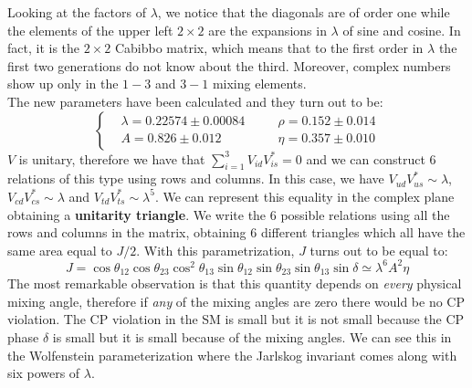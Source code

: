 \documentclass[../main.tex]{subfiles}
\begin{document}
Looking at the factors of $\lambda$, we notice that the diagonals are of order one while the elements of the upper left $2\times2$ are the expansions in $\lambda$ of sine and cosine. In fact, it is the $2\times2$ Cabibbo matrix, which means that to the first order in $\lambda$ the first two generations do not know about the third. Moreover, complex numbers show up only in the $1-3$ and $3-1$ mixing elements.\\
The new parameters have been calculated and they turn out to be:
\[
\left\{
\begin{aligned}
&\lambda=0.22574\pm0.00084 \quad &&\rho=0.152\pm0.014\\
&A=0.826\pm0.012 \quad &&\eta=0.357\pm0.010
\end{aligned}
\right.
\]
$V$ is unitary, therefore we have that $\sum_{i=1}^3V_{id}V_{is}^*=0$ and we can construct 6 relations of this type using rows and columns. In this case, we have $V_{ud}V_{us}^*\sim\lambda$, $V_{cd}V_{cs}^*\sim\lambda$ and $V_{td}V_{ts}^*\sim\lambda^5$. We can represent this equality in the complex plane obtaining a \textbf{unitarity triangle}.
We write the 6 possible relations using all the rows and columns in the matrix, obtaining 6 different triangles which all have the same area equal to $J/2$. With this parametrization, $J$ turns out to be equal to:
\[
J=\cos\theta_{12}\cos\theta_{23}\cos^2\theta_{13}\sin\theta_{12}\sin\theta_{23}\sin\theta_{13}\sin\delta\simeq\lambda^6A^2\eta
\]
The most remarkable observation is that this quantity depends on \textit{every} physical mixing angle, therefore if \textit{any} of the mixing angles are zero there would be no CP violation. The CP violation in the SM is small but it is not small because the CP phase $\delta$ is small but it is small because of the mixing angles. We can see this in the Wolfenstein parameterization where the Jarlskog invariant comes along with six powers of $\lambda$.\\
\end{document}
